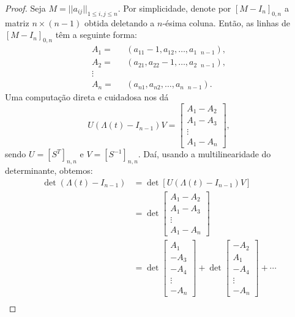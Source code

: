 	\begin{proof}
		Seja $M = ||a_{ij}||_{1\leq i,j\leq n}$. Por simplicidade, denote por $[M - I_n]_{0,n}$ 
		a matriz $n\times(n-1)$ obtida deletando a $n$-ésima coluna. Então, as linhas de 
		$[M - I_n]_{0,n}$ têm a seguinte forma:
		\begin{align*}
    		A_1 =& \text{ }(a_{11} - 1, a_{12}, \dots, a_{1\text{ }n-1}), \\
    		A_2 =& \text{ }(a_{21}, a_{22} - 1, \dots, a_{2\text{ }n-1}), \\
    		\vdots& \\
    		A_n =& \text{ }(a_{n1}, a_{n2}, \dots, a_{n\text{ }n-1}).
		\end{align*}
		Uma computação direta e cuidadosa nos dá
		\begin{equation*}
    		U(\Lambda(t) - I_{n-1})V = \begin{bmatrix}
    		A_1 - A_2 \\
    		A_1 - A_3 \\
    		\vdots \\
    		A_1 - A_n
    		\end{bmatrix},
		\end{equation*}
		sendo $U = [S^T]_{n,n}$ e $V = [S^{-1}]_{n,n}$. Daí, usando a multilinearidade 
		do determinante, obtemos:
		\begin{align*}
    		\det(\Lambda(t) - I_{n-1}) 
    		&=\det[U(\Lambda(t) - I_{n-1})V] 
    		\\
    		&= \det\begin{bmatrix}
    		A_1 - A_2\\
    		A_1 - A_3 \\
    		\vdots \\
    		A_1 - A_n
    		\end{bmatrix}
    		\\
    		&= \det\begin{bmatrix}
    		A_1 \\
    		-A_3 \\
    		-A_4 \\
    		\vdots \\
    		-A_n
    		\end{bmatrix} + \det\begin{bmatrix}
    		-A_2 \\
    		A_1 \\
    		-A_4 \\
    		\vdots\\
    		-A_n
    		\end{bmatrix} + \cdots \\ 

\end{align*}
\end{proof}
